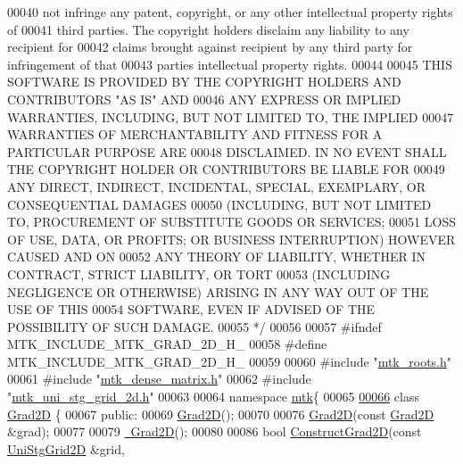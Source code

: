 \begin{DoxyCode}
00040 \textcolor{comment}{not infringe any patent, copyright, or any other intellectual property rights of}
00041 \textcolor{comment}{third parties. The copyright holders disclaim any liability to any recipient for}
00042 \textcolor{comment}{claims brought against recipient by any third party for infringement of that}
00043 \textcolor{comment}{parties intellectual property rights.}
00044 \textcolor{comment}{}
00045 \textcolor{comment}{THIS SOFTWARE IS PROVIDED BY THE COPYRIGHT HOLDERS AND CONTRIBUTORS "AS IS" AND}
00046 \textcolor{comment}{ANY EXPRESS OR IMPLIED WARRANTIES, INCLUDING, BUT NOT LIMITED TO, THE IMPLIED}
00047 \textcolor{comment}{WARRANTIES OF MERCHANTABILITY AND FITNESS FOR A PARTICULAR PURPOSE ARE}
00048 \textcolor{comment}{DISCLAIMED. IN NO EVENT SHALL THE COPYRIGHT HOLDER OR CONTRIBUTORS BE LIABLE FOR}
00049 \textcolor{comment}{ANY DIRECT, INDIRECT, INCIDENTAL, SPECIAL, EXEMPLARY, OR CONSEQUENTIAL DAMAGES}
00050 \textcolor{comment}{(INCLUDING, BUT NOT LIMITED TO, PROCUREMENT OF SUBSTITUTE GOODS OR SERVICES;}
00051 \textcolor{comment}{LOSS OF USE, DATA, OR PROFITS; OR BUSINESS INTERRUPTION) HOWEVER CAUSED AND ON}
00052 \textcolor{comment}{ANY THEORY OF LIABILITY, WHETHER IN CONTRACT, STRICT LIABILITY, OR TORT}
00053 \textcolor{comment}{(INCLUDING NEGLIGENCE OR OTHERWISE) ARISING IN ANY WAY OUT OF THE USE OF THIS}
00054 \textcolor{comment}{SOFTWARE, EVEN IF ADVISED OF THE POSSIBILITY OF SUCH DAMAGE.}
00055 \textcolor{comment}{*/}
00056 
00057 \textcolor{preprocessor}{#ifndef MTK\_INCLUDE\_MTK\_GRAD\_2D\_H\_}
00058 \textcolor{preprocessor}{#define MTK\_INCLUDE\_MTK\_GRAD\_2D\_H\_}
00059 
00060 \textcolor{preprocessor}{#include "\hyperlink{mtk__roots_8h}{mtk\_roots.h}"}
00061 \textcolor{preprocessor}{#include "\hyperlink{mtk__dense__matrix_8h}{mtk\_dense\_matrix.h}"}
00062 \textcolor{preprocessor}{#include "\hyperlink{mtk__uni__stg__grid__2d_8h}{mtk\_uni\_stg\_grid\_2d.h}"}
00063 
00064 \textcolor{keyword}{namespace }\hyperlink{namespacemtk}{mtk}\{
00065 
\hypertarget{mtk__grad__2d_8h_source_l00066}{}\hyperlink{classmtk_1_1Grad2D}{00066} \textcolor{keyword}{class }\hyperlink{classmtk_1_1Grad2D}{Grad2D} \{
00067  \textcolor{keyword}{public}:
00069   \hyperlink{classmtk_1_1Grad2D_a15bdca254b7bf662913b34c7afb8d4c9}{Grad2D}();
00070 
00076   \hyperlink{classmtk_1_1Grad2D_a15bdca254b7bf662913b34c7afb8d4c9}{Grad2D}(\textcolor{keyword}{const} \hyperlink{classmtk_1_1Grad2D}{Grad2D} &grad);
00077 
00079   \hyperlink{classmtk_1_1Grad2D_ae6a071b24422d057c41346e80be96cb3}{~Grad2D}();
00080 
00086   \textcolor{keywordtype}{bool} \hyperlink{classmtk_1_1Grad2D_a9771be954c59880e3d83f4d645378c00}{ConstructGrad2D}(\textcolor{keyword}{const} \hyperlink{classmtk_1_1UniStgGrid2D}{UniStgGrid2D} &grid,

\end{DoxyCode}
